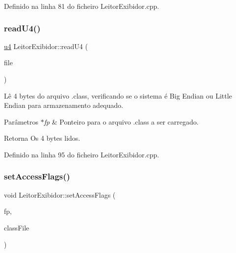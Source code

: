 Definido na linha 81 do ficheiro Leitor\+Exibidor.\+cpp.

\mbox{\label{classLeitorExibidor_a5ce4bdf25870ab04449d4ba35a961390}} 
\subsubsection{\texorpdfstring{read\+U4()}{readU4()}}
{\footnotesize\ttfamily \hyperlink{BasicTypes_8h_ae5be1f726785414dd1b77d60df074c9d}{u4} Leitor\+Exibidor\+::read\+U4 (\begin{DoxyParamCaption}\item[{F\+I\+LE $\ast$}]{file }\end{DoxyParamCaption})\hspace{0.3cm}{\ttfamily [private]}}

Lê 4 bytes do arquivo .class, verificando se o sistema é Big Endian ou Little Endian para armazenamento adequado. 
\begin{DoxyParams}{Parâmetros}
{\em $\ast$fp} & Ponteiro para o arquivo .class a ser carregado. \\
\hline
\end{DoxyParams}
\begin{DoxyReturn}{Retorna}
Os 4 bytes lidos. 
\end{DoxyReturn}


Definido na linha 95 do ficheiro Leitor\+Exibidor.\+cpp.

\mbox{\label{classLeitorExibidor_a7934c3a6d4da59ecb351d32b74240c60}} 
\subsubsection{\texorpdfstring{set\+Access\+Flags()}{setAccessFlags()}}
{\footnotesize\ttfamily void Leitor\+Exibidor\+::set\+Access\+Flags (\begin{DoxyParamCaption}\item[{F\+I\+LE $\ast$}]{fp,  }\item[{\hyperlink{classClassFile}{Class\+File} $\ast$}]{class\+File }\end{DoxyParamCaption})\hspace{0.3cm}{\ttfamily [private]}}

